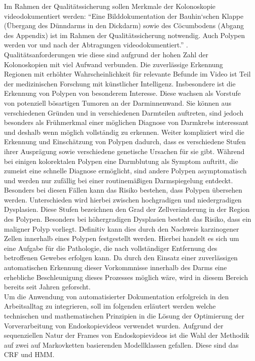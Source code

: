 Im Rahmen der Qualitätssicherung sollen Merkmale der Kolonoskopie videodokumentiert werden: \enquote{Eine Bilddokumentation der Bauhin‘schen Klappe (Übergang des Dünndarms in den Dickdarm) sowie des Cöcumbodens (Abgang des Appendix) ist im Rahmen der Qualitätssicherung notwendig. Auch Polypen werden vor und nach der Abtragungen videodokumentiert.} \cite{Beyer2022}. Qualitätsanforderungen wie diese sind aufgrund der hohen Zahl der Kolonoskopien mit viel Aufwand verbunden.
Die zuverlässige Erkennung Regionen mit erhöhter Wahrscheinlichkeit für relevante Befunde im Video ist Teil der medizinischen Forschung mit künstlicher Intelligenz. Insbesondere ist die Erkennung von Polypen von besonderem Interesse.
Diese wachsen als Vorstufe von potenziell bösartigen Tumoren an der Darminnenwand. Sie können aus verschiedenen Gründen und in verschiedenen Darmteilen auftreten, 
sind jedoch besonders als Frühmerkmal einer möglichen Diagnose von Darmkrebs interessant und deshalb wenn möglich vollständig zu erkennen. \citep{doi:10.7326/0003-4819-157-4-201208210-00002}
Weiter kompliziert wird die Erkennung und Einschätzung von Polypen dadurch, dass es verschiedene Stufen ihrer Ausprägung sowie verschiedene genetische Ursachen für sie gibt. \cite{PickhardtColonPolyps}
Während bei einigen kolorektalen Polypen eine Darmblutung als Symptom auftritt, die zumeist eine schnelle Diagnose ermöglicht, sind andere Polypen asymptomatisch und werden nur zufällig bei einer routinemäßigen Darmspiegelung entdeckt.
Besonders bei diesen Fällen kann das Risiko bestehen, dass Polypen übersehen werden.
Unterschieden wird hierbei zwischen hochgradigen und niedergradigen Dysplasien. Diese Stufen bezeichnen den Grad der Zellveränderung in der Region des Polypen.
Besonders bei höhergradigen Dysplasien besteht das Risiko, dass ein maligner Polyp vorliegt.
Definitiv kann dies durch den Nachweis karzinogener Zellen innerhalb eines Polypen festgestellt werden. Hierbei handelt es sich um eine Aufgabe für die Pathologie,
die nach vollständiger Entfernung des betroffenen Gewebes erfolgen kann. \citep{Colucci261}
Da durch den Einsatz einer zuverlässigen automatischen Erkennung dieser Vorkommnisse innerhalb des Darms eine erhebliche Beschleunigung dieses Prozesses möglich wäre, wird in diesem Bereich bereits seit Jahren geforscht. \citep{talukder-2022}
\\
Um die Anwendung von automatisierter Dokumentation erfolgreich in den Arbeitsalltag zu integrieren, soll im folgenden erläutert werden welche technischen und mathematischen Prinzipien in die Lösung der Optimierung der Vorverarbeitung von Endoskopievideos verwendet wurden. Aufgrund der sequenziellen Natur der Frames von Endoskopievideos ist die Wahl der Methodik auf zwei auf Markovketten basierenden Modellklassen gefallen. Diese sind das CRF und HMM.
